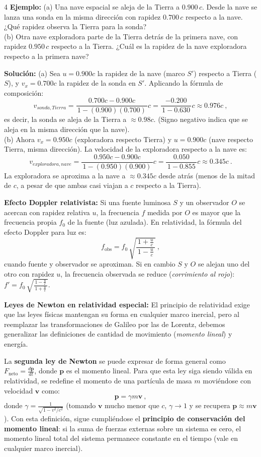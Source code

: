 \documentclass[landscape,10pt]{article}
\begin{document}
\begin{multicols}{4}
\medskip \noindent \textbf{Ejemplo:} 
(a) Una nave espacial se aleja de la Tierra a $0.900\,c$. Desde la nave se lanza una sonda en la misma dirección con rapidez $0.700\,c$ respecto a la nave. ¿Qué rapidez observa la Tierra para la sonda? \\
(b) Otra nave exploradora parte de la Tierra detrás de la primera nave, con rapidez $0.950\,c$ respecto a la Tierra. ¿Cuál es la rapidez de la nave exploradora respecto a la primera nave?

\textbf{Solución:} 
(a) Sea $u=0.900c$ la rapidez de la nave (marco $S'$) respecto a Tierra ($S$), y $v_x = 0.700c$ la rapidez de la sonda en $S'$. Aplicando la fórmula de composición:
\[ v_{sonda,Tierra} = \frac{0.700c - 0.900c}{\,1 - (0.900)(0.700)\,}c = \frac{-0.200}{\,1 - 0.630\,}c \approx 0.976c~,\] 
es decir, la sonda se aleja de la Tierra a $\approx 0.98c$. (Signo negativo indica que se aleja en la misma dirección que la nave). \\
(b) Ahora $v_x = 0.950c$ (exploradora respecto Tierra) y $u = 0.900c$ (nave respecto Tierra, misma dirección). La velocidad de la exploradora respecto a la nave es: 
\[ v_{exploradora,nave} = \frac{0.950c - 0.900c}{\,1 - (0.950)(0.900)\,}c = \frac{0.050}{\,1 - 0.855\,}c \approx 0.345c~.\] 
La exploradora se aproxima a la nave a $\approx 0.345c$ desde atrás (menos de la mitad de $c$, a pesar de que ambas casi viajan a $c$ respecto a la Tierra).

\columnbreak
\noindent \textbf{Efecto Doppler relativista:} Si una fuente luminosa $S$ y un observador $O$ se acercan con rapidez relativa $u$, la frecuencia $f$ medida por $O$ es mayor que la frecuencia propia $f_0$ de la fuente (luz azulada). En relatividad, la fórmula del efecto Doppler para luz es:
\[
f_{\text{obs}} = f_0\,\sqrt{\frac{\,1 + \frac{u}{c}\,}{\,1 - \frac{u}{c}\,}}~,
\] 
cuando fuente y observador se aproximan. Si en cambio $S$ y $O$ se alejan uno del otro con rapidez $u$, la frecuencia observada se reduce (\emph{corrimiento al rojo}): $f' = f_0\,\sqrt{\frac{\,1 - \frac{u}{c}\,}{\,1 + \frac{u}{c}\,}}$.

\medskip \noindent \textbf{Leyes de Newton en relatividad especial:} El principio de relatividad exige que las leyes físicas mantengan su forma en cualquier marco inercial, pero al reemplazar las transformaciones de Galileo por las de Lorentz, debemos generalizar las definiciones de cantidad de movimiento (\emph{momento lineal}) y energía. 

La \textbf{segunda ley de Newton} se puede expresar de forma general como $F_\text{neto} = \frac{d\mathbf{p}}{dt}$, donde $\mathbf{p}$ es el momento lineal. Para que esta ley siga siendo válida en relatividad, se redefine el momento de una partícula de masa $m$ moviéndose con velocidad $\mathbf{v}$ como:
\[
\mathbf{p} = \gamma m \mathbf{v}~,
\] 
donde $\gamma = \frac{1}{\sqrt{1 - v^2/c^2}}$ (tomando $\mathbf{v}$ mucho menor que $c$, $\gamma \to 1$ y se recupera $\mathbf{p} \approx m\mathbf{v}$). Con esta definición, sigue cumpliéndose el \textbf{principio de conservación del momento lineal}: si la suma de fuerzas externas sobre un sistema es cero, el momento lineal total del sistema permanece constante en el tiempo (vale en cualquier marco inercial).


\end{multicols}
\end{document}
